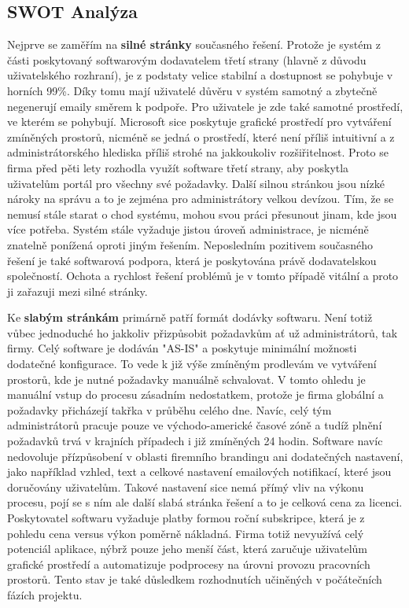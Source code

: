 \documentclass[12pt]{article}
\begin{document}
\begin{sloppypar}
\begin{spacing}{1.15}
        \subsection*{SWOT Analýza}
        Nejprve se zaměřím na \textbf{silné stránky} současného řešení. Protože
        je systém z části poskytovaný softwarovým dodavatelem třetí strany
        (hlavně z důvodu uživatelského rozhraní), je z podstaty velice stabilní a
        dostupnost se pohybuje v horních 99\%. Díky tomu mají uživatelé důvěru v
        systém samotný a zbytečně negenerují emaily směrem k podpoře. Pro
        uživatele je zde také samotné prostředí, ve kterém se pohybují.
        Microsoft sice poskytuje grafické prostředí pro vytváření zmíněných
        prostorů, nicméně se jedná o prostředí, které není příliš intuitivní a 
        z administrátorského hlediska příliš strohé na jakkoukoliv
        rozšiřitelnost. Proto se firma před pěti lety rozhodla využít software
        třetí strany, aby poskytla uživatelům portál pro všechny své požadavky.
        Další silnou stránkou jsou nízké nároky na správu a to je zejména pro 
        administrátory velkou devízou. Tím, že se nemusí stále starat o chod
        systému, mohou svou práci přesunout jinam, kde jsou více potřeba. Systém
        stále vyžaduje jistou úroveň administrace, je nicméně znatelně ponížená
        oproti jiným řešením. Neposledním pozitivem současného řešení je také
        softwarová podpora, která je poskytována právě dodavatelskou
        společností. Ochota a rychlost řešení problémů je v tomto případě
        vitální a proto ji zařazuji mezi silné stránky.

        Ke \textbf{slabým stránkám} primárně patří formát dodávky softwaru. Není
        totiž vůbec jednoduché
        ho jakkoliv přizpůsobit požadavkům ať už administrátorů, tak firmy. Celý
        software je dodáván "AS-IS" a poskytuje minimální možnosti dodatečné
        konfigurace. To vede k již výše zmíněným prodlevám ve vytváření
        prostorů, kde je nutné požadavky manuálně schvalovat. V tomto ohledu je
        manuální vstup do procesu zásadním nedostatkem, protože je firma
        globální a požadavky přicházejí takřka v průběhu celého dne. Navíc, celý 
        tým administrátorů pracuje pouze ve východo-americké časové zóně a tudíž
        plnění požadavků trvá v krajních případech i již zmíněných 24 hodin.
        Software navíc nedovoluje přízpůsobení v oblasti firemního brandingu ani
        dodatečných nastavení, jako například vzhled, text a celkové nastavení
        emailových notifikací, které jsou doručovány uživatelům. Takové
        nastavení sice nemá přímý vliv na výkonu procesu, pojí se s ním ale další
        slabá stránka řešení a to je celková cena za licenci. Poskytovatel
        softwaru vyžaduje platby formou roční subskripce, která je z pohledu
        cena versus výkon poměrně nákladná. Firma totiž nevyužívá celý potenciál
        aplikace, nýbrž pouze jeho menší část, která zaručuje uživatelům
        grafické prostředí a automatizuje podprocesy na úrovni provozu
        pracovních prostorů. Tento stav je také důsledkem rozhodnutích učiněných
        v počátečních fázích projektu.


\end{spacing}
\end{sloppypar}
\end{document}
